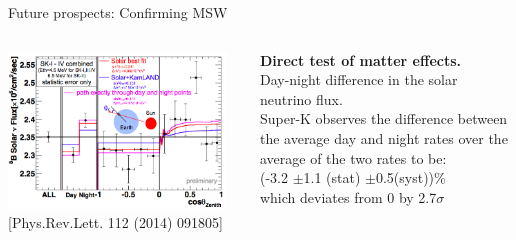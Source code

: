 \begin{frame}[t]{Future prospects: Confirming MSW}

\begin{columns}
  \begin{column}{0.65\textwidth}
    \centering
     \includegraphics[width=0.95\textwidth]{./images/3nu/solar/sk_day_night_zenith.png}\\
     \vspace{0.2cm}
     {\color{blue}[Phys.Rev.Lett. 112 (2014) 091805]}
  \end{column}
  \begin{column}{0.35\textwidth}
     \begin{center}
     {\scriptsize
       {\bf Direct test of matter effects.}\\
       \vspace{0.2cm}
       Day-night difference in the solar neutrino flux.\\
       \vspace{0.2cm}
       Super-K observes the difference between the average day and night rates
       over the average of the two rates to be:\\
       \vspace{0.2cm}
       {\color{red}(-3.2 $\pm$1.1 (stat) $\pm$0.5(syst))\%}\\
       \vspace{0.2cm}
       which deviates from 0 by 2.7$\sigma$\\
     }
     \end{center}
  \end{column}
\end{columns}
\end{frame}


